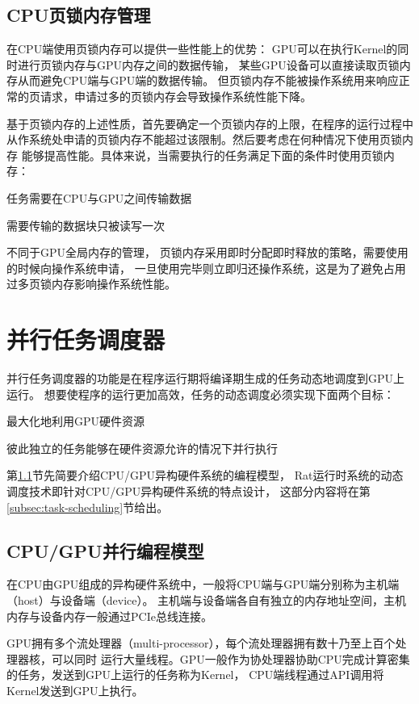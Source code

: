 \subsection{CPU页锁内存管理}
在CPU端使用页锁内存可以提供一些性能上的优势：
GPU可以在执行Kernel的同时进行页锁内存与GPU内存之间的数据传输，
某些GPU设备可以直接读取页锁内存从而避免CPU端与GPU端的数据传输。
但页锁内存不能被操作系统用来响应正常的页请求，申请过多的页锁内存会导致操作系统性能下降。

基于页锁内存的上述性质，首先要确定一个页锁内存的上限，在程序的运行过程中
从作系统处申请的页锁内存不能超过该限制。然后要考虑在何种情况下使用页锁内存
能够提高性能。具体来说，当需要执行的任务满足下面的条件时使用页锁内存：
\begin{compactitem}
  \item 任务需要在CPU与GPU之间传输数据
  \item 需要传输的数据块只被读写一次
\end{compactitem}

不同于GPU全局内存的管理，
页锁内存采用即时分配即时释放的策略，需要使用的时候向操作系统申请，
一旦使用完毕则立即归还操作系统，这是为了避免占用过多页锁内存影响操作系统性能。

\section{并行任务调度器}\label{sec:task-scheduler}
并行任务调度器的功能是在程序运行期将编译期生成的任务动态地调度到GPU上运行。
想要使程序的运行更加高效，任务的动态调度必须实现下面两个目标：
\begin{compactitem}
  \item 最大化地利用GPU硬件资源
  \item 彼此独立的任务能够在硬件资源允许的情况下并行执行
\end{compactitem}

第\ref{cpu-gpu-model}节先简要介绍CPU/GPU异构硬件系统的编程模型，
Rat运行时系统的动态调度技术即针对CPU/GPU异构硬件系统的特点设计，
这部分内容将在第\ref{subsec:task-scheduling}节给出。

\subsection{CPU/GPU并行编程模型}\label{cpu-gpu-model}
在CPU由GPU组成的异构硬件系统中，一般将CPU端与GPU端分别称为主机端（host）与设备端（device）。
主机端与设备端各自有独立的内存地址空间，主机内存与设备内存一般通过PCIe总线连接。

GPU拥有多个流处理器（multi-processor），每个流处理器拥有数十乃至上百个处理器核，可以同时
运行大量线程。GPU一般作为协处理器协助CPU完成计算密集的任务，发送到GPU上运行的任务称为Kernel，
CPU端线程通过API调用将Kernel发送到GPU上执行。

